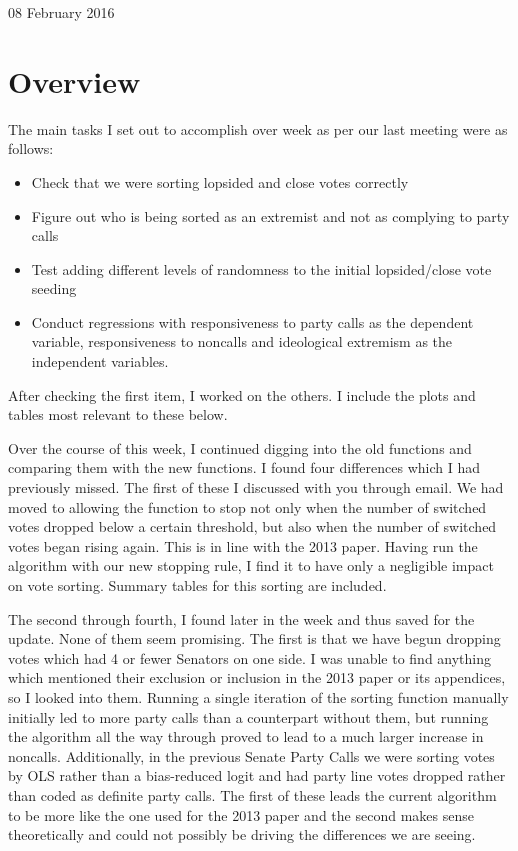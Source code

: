 \documentclass[12pt]{article}
\begin{document}
\begin{center}
\Large 08 February 2016
\end{center}

\section{Overview}

The main tasks I set out to accomplish over week as per our last meeting were as follows:

\begin{itemize}
	\item Check that we were sorting lopsided and close votes correctly
	
		\item Figure out who is being sorted as an extremist and not as complying to party calls
	
	\item Test adding different levels of randomness to the initial lopsided/close vote seeding
	
	\item Conduct regressions with responsiveness to party calls as the dependent variable, responsiveness to noncalls and ideological extremism as the independent variables.
\end{itemize}

\noindent
After checking the first item, I worked on the others. I include the plots and tables most relevant to these below.

Over the course of this week, I continued digging into the old functions and comparing them with the new functions. I found four differences which I had previously missed. The first of these I discussed with you through email. We had moved to allowing the function to stop not only when the number of switched votes dropped below a certain threshold, but also when the number of switched votes began rising again. This is in line with the 2013 paper. Having run the algorithm with our new stopping rule, I find it to have only a negligible impact on vote sorting. Summary tables for this sorting are included.

The second through fourth, I found later in the week and thus saved for the update. None of them seem promising. The first is that we have begun dropping votes which had 4 or fewer Senators on one side. I was unable to find anything which mentioned their exclusion or inclusion in the 2013 paper or its appendices, so I looked into them. Running a single iteration of the sorting function manually initially led to more party calls than a counterpart without them, but running the algorithm all the way through proved to lead to a much larger increase in noncalls. Additionally, in the previous Senate Party Calls we were sorting votes by OLS rather than a bias-reduced logit and had party line votes dropped rather than coded as definite party calls. The first of these leads the current algorithm to be more like the one used for the 2013 paper and the second makes sense theoretically and could not possibly be driving the differences we are seeing.
\end{document}
